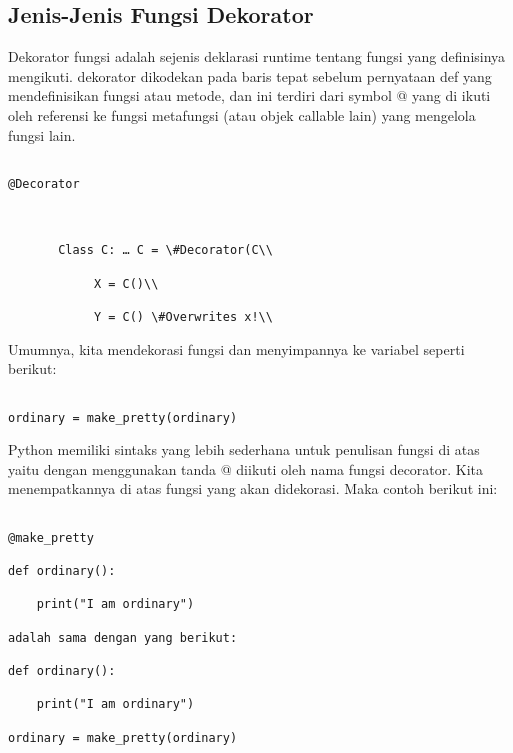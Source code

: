 \documentclass[12pt,a4paper]{article}
\begin{document}
\subsection{Jenis-Jenis Fungsi Dekorator}





Dekorator fungsi adalah sejenis deklarasi runtime tentang fungsi yang definisinya mengikuti. dekorator dikodekan pada baris tepat sebelum pernyataan def yang mendefinisikan fungsi atau metode, dan ini terdiri dari symbol @ yang di ikuti oleh referensi ke fungsi metafungsi (atau objek callable lain) yang mengelola fungsi lain.





\begin{verbatim}

@Decorator



       Class C: … C = \#Decorator(C\\

            X = C()\\

            Y = C() \#Overwrites x!\\

\end{verbatim}

            

Umumnya, kita mendekorasi fungsi dan menyimpannya ke variabel seperti berikut:

\begin{verbatim}

ordinary = make_pretty(ordinary)

\end{verbatim}



Python memiliki sintaks yang lebih sederhana untuk penulisan fungsi di atas yaitu dengan menggunakan tanda  @ diikuti oleh nama fungsi decorator. Kita menempatkannya di atas fungsi yang akan didekorasi. Maka contoh berikut ini:



\begin{verbatim}

@make_pretty

def ordinary():

    print("I am ordinary")

adalah sama dengan yang berikut:

def ordinary():

    print("I am ordinary")

ordinary = make_pretty(ordinary)

\end{verbatim}
\end{document}
